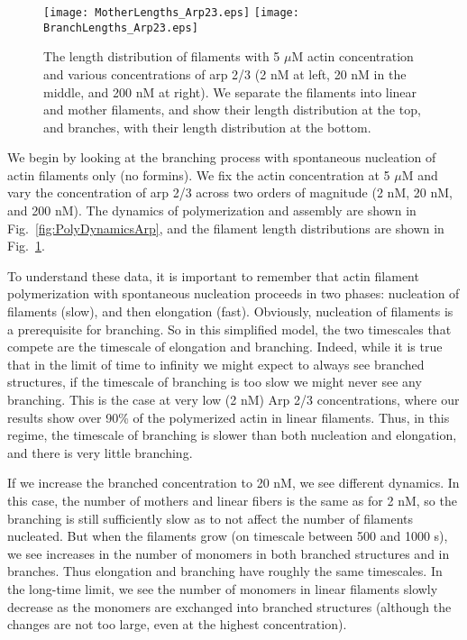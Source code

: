 \documentclass[11pt]{article}
\begin{document}
\begin{figure}
\centering
\texttt{[image: MotherLengths\_Arp23.eps]}
\texttt{[image: BranchLengths\_Arp23.eps]}
\caption{\label{fig:LengthDistsArp} The length distribution of filaments with 5 $\mu$M actin concentration and various concentrations of arp 2/3 (2 nM at left, 20 nM in the middle, and 200 nM at right). We separate the filaments into linear and mother filaments, and show their length distribution at the top, and branches, with their length distribution at the bottom. }
\end{figure}

We begin by looking at the branching process with spontaneous nucleation of actin filaments only (no formins). We fix the actin concentration at 5 $\mu$M and vary the concentration of arp 2/3 across two orders of magnitude (2 nM, 20 nM, and 200 nM). The dynamics of polymerization and assembly are shown in Fig.\ \ref{fig:PolyDynamicsArp}, and the filament length distributions are shown in Fig.\ \ref{fig:LengthDistsArp}. 

To understand these data, it is important to remember that actin filament polymerization with spontaneous nucleation proceeds in two phases: nucleation of filaments (slow), and then elongation (fast). Obviously, nucleation of filaments is a prerequisite for branching. So in this simplified model, the two timescales that compete are the timescale of elongation and branching. Indeed, while it is true that in the limit of time to infinity we might expect to always see branched structures, if the timescale of branching is too slow we might never see any branching. This is the case at very low (2 nM) Arp 2/3 concentrations, where our results show over 90\% of the polymerized actin in linear filaments. Thus, in this regime, the timescale of branching is slower than both nucleation and elongation, and there is very little branching. 

If we increase the branched concentration to 20 nM, we see different dynamics. In this case, the number of mothers and linear fibers is the same as for 2 nM, so the branching is still sufficiently slow as to not affect the number of filaments nucleated. But when the filaments grow (on timescale between 500 and 1000 s), we see increases in the number of monomers in both branched structures and in branches. Thus elongation and branching have roughly the same timescales. In the long-time limit, we see the number of monomers in linear filaments slowly decrease as the monomers are exchanged into branched structures (although the changes are not too large, even at the highest concentration).
\end{document}
